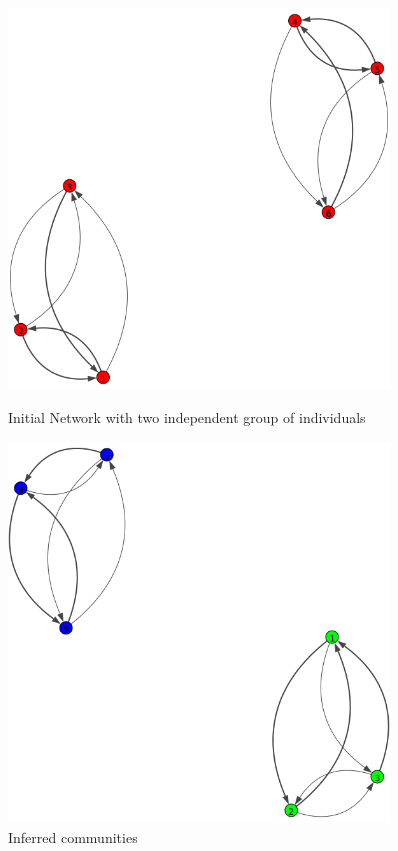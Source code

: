 \documentclass[12pt]{ociamthesis}  %
\begin{document}
	
	\begin{figure}[H]
		\centering
		\begin{minipage}{0.45\textwidth}
			\centering
			\includegraphics[width=0.9\textwidth]{PlotToyExample} %
			\caption{Initial Network with two independent group of individuals}
			\label{label-image15}
		\end{minipage}\hfill
		\begin{minipage}{0.45\textwidth}
			\centering
			\includegraphics[width=0.9\textwidth]{PlotToyExampleFinal} %
			\caption{Inferred communities}
			\label{label-image16}
		\end{minipage}
	\end{figure}
	
\end{document}
